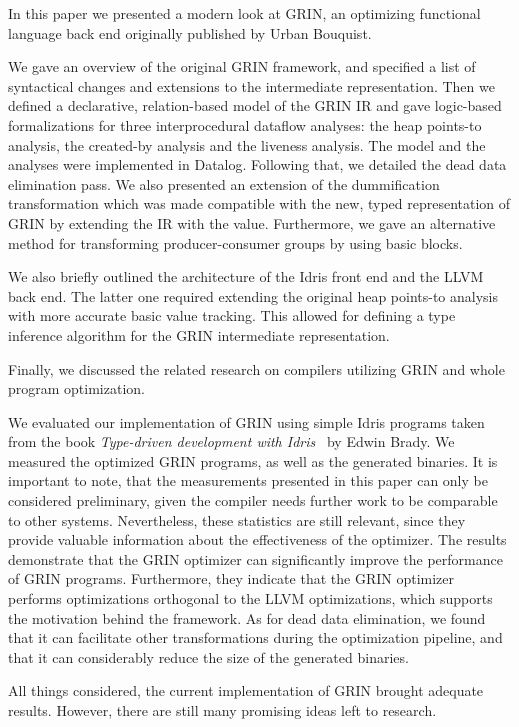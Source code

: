 \documentclass[main.tex]{subfiles}
\begin{document}
	
	In this paper we presented a modern look at GRIN, an optimizing functional language back end originally published by Urban Bouquist.
	
	We gave an overview of the original GRIN framework, and specified a list of syntactical changes and extensions to the intermediate representation. Then we defined a declarative, relation-based model of the GRIN IR and gave logic-based formalizations for three interprocedural dataflow analyses: the heap points-to analysis, the created-by analysis and the liveness analysis. The model and the analyses were implemented in Datalog. Following that, we detailed the dead data elimination pass. We also presented an extension of the dummification transformation which was made compatible with the new, typed representation of GRIN by extending the IR with the  value. Furthermore, we gave an alternative method for transforming producer-consumer groups by using basic blocks. 
    
    We also briefly outlined the architecture of the Idris front end and the LLVM back end. The latter one required extending the original heap points-to analysis with more accurate basic value tracking. This allowed for defining a type inference algorithm for the GRIN intermediate representation.
    
    Finally, we discussed the related research on compilers utilizing GRIN and whole program optimization.
	
	We evaluated our implementation of GRIN using simple Idris programs taken from the book \textit{Type-driven development with Idris}~\cite{tdd-idris} by Edwin Brady. We measured the optimized GRIN programs, as well as the generated binaries. It is important to note, that the measurements presented in this paper can only be considered preliminary, given the compiler needs further work to be comparable to other systems. Nevertheless, these statistics are still relevant, since they provide valuable information about the effectiveness of the optimizer. The results demonstrate that the GRIN optimizer can significantly improve the performance of GRIN programs. Furthermore, they indicate that the GRIN optimizer performs optimizations orthogonal to the LLVM optimizations, which supports the motivation behind the framework. As for dead data elimination, we found that it can facilitate other transformations during the optimization pipeline, and that it can considerably reduce the size of the generated binaries.
	
	All things considered, the current implementation of GRIN brought adequate results. However, there are still many promising ideas left to research.
	
\end{document}
